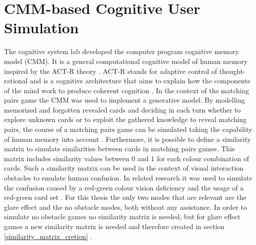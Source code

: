 \chapter{CMM-based Cognitive User Simulation}
\label{simulator}
The cognitive system lab developed the computer program cognitive memory model (CMM).
It is a general computational cognitive model of human memory inspired by the ACT-R theory \cite[p.~161]{salous_putze_2018esann}. ACT-R stands for adaptive control of thought-rational and is a cognitive architecture that aims to explain how the components of the mind work to produce coherent cognition \cite[p.~1036]{actr}. In the context of the matching pairs game the CMM was used to implement a generative model. By modelling memorized and forgotten revealed cards and deciding in each turn whether to explore unknown cards or to exploit the gathered knowledge to reveal matching pairs, the course of a matching pairs game can be simulated taking the capability of human memory into account \cite[p.~161]{memory}. Furthermore, it is possible to define a similarity matrix to simulate similarities between cards in matching pairs games. This matrix includes similarity values between 0 and 1 for each colour combination of cards. Such a similarity matrix can be used in the context of visual interaction obstacles to emulate human confusion. In related research it was used to simulate the confusion caused by a red-green colour vision deficiency and the usage of a red-green card set \cite[p.~3]{blind}. %
For this thesis the only two modes that are relevant are the glare effect and the no obstacle modes, both without any assistance. In order to simulate no obstacle games no similarity matrix is needed, but for glare effect games a new similarity matrix is needed and therefore created in section \ref{similarity_matrix_cretion} .


